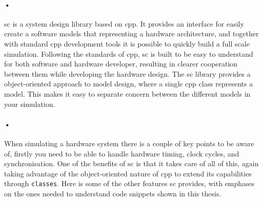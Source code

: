 \documentclass[a4paper]{report}
\newcommand{\codeword}[1]{\texttt{#1}}
\begin{document}
{\paragraph{•}
\gls{sc} is a system design library based on \gls{cpp}.
It provides an interface for easily create a software models that representing a hardware architecture, and together with standard \gls{cpp} development tools it is possible to quickly build a full scale simulation.
Following the standards of \gls{cpp}, \gls{sc} is built to be easy to understand for both software and hardware developer, resulting in clearer cooperation between them while developing the hardware design.
The \gls{sc} library provides a object-oriented approach to model design, where a single \gls{cpp} class represents a model.
This makes it easy to separate concern between the different models in your simulation.
\paragraph{•}
When simulating a hardware system there is a couple of key points to be aware of, firstly you need to be able to handle hardware timing, clock cycles, and synchronisation.
One of the benefits of \gls{sc} is that it takes care of all of this, again taking advantage of the object-oriented nature of \gls{cpp} to extend its capabilities through \codeword{classes}.
Here is some of the other features \gls{sc} provides, with emphases on the ones needed to understand code snippets shown in this thesis.

}
\end{document}
